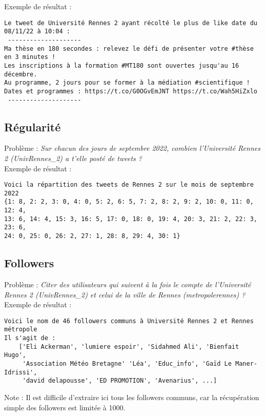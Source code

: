 \documentclass[11pt,a4paper]{article}
\begin{document}
Exemple de résultat : 
\begin{verbatim}
Le tweet de Université Rennes 2 ayant récolté le plus de like date du 08/11/22 à 10:04 : 
 --------------------
Ma thèse en 180 secondes : relevez le défi de présenter votre #thèse en 3 minutes !
Les inscriptions à la formation #MT180 sont ouvertes jusqu'au 16 décembre. 
Au programme, 2 jours pour se former à la médiation #scientifique ! 
Dates et programmes : https://t.co/G0OGvEmJNT https://t.co/Wah5HiZxlo
 --------------------
\end{verbatim}




\subsection{Régularité}

Problème : \emph{Sur chacun des jours de septembre 2022, combien l'Université Rennes 2 (UnivRennes\_2) a t'elle posté de tweets ? }
\\

Exemple de résultat :
\begin{verbatim}
Voici la répartition des tweets de Rennes 2 sur le mois de septembre 2022
{1: 8, 2: 2, 3: 0, 4: 0, 5: 2, 6: 5, 7: 2, 8: 2, 9: 2, 10: 0, 11: 0, 12: 4, 
13: 6, 14: 4, 15: 3, 16: 5, 17: 0, 18: 0, 19: 4, 20: 3, 21: 2, 22: 3, 23: 6, 
24: 0, 25: 0, 26: 2, 27: 1, 28: 8, 29: 4, 30: 1}
\end{verbatim}

\subsection{Followers}

Problème :
\emph{Citer des utilisateurs qui suivent à la fois le compte de l'Université Rennes 2 (UnivRennes\_2) et celui de la ville de Rennes (metropolerennes) ?}
\\

Exemple de résultat :

\begin{verbatim}
Voici le nom de 46 followers communs à Université Rennes 2 et Rennes métropole
Il s'agit de :
    ['Eli Ackerman', 'lumiere espoir', 'Sidahmed Ali', 'Bienfait Hugo',
     'Association Météo Bretagne' 'Léa', 'Educ_info', 'Gaïd Le Maner-Idrissi', 
     'david delapousse', 'ED PROMOTION', 'Avenarius', ...]
\end{verbatim}
Note : Il est difficile d'extraire ici tous les followers communs, car la récupération simple des followers est limitée à 1000.
\end{document}
